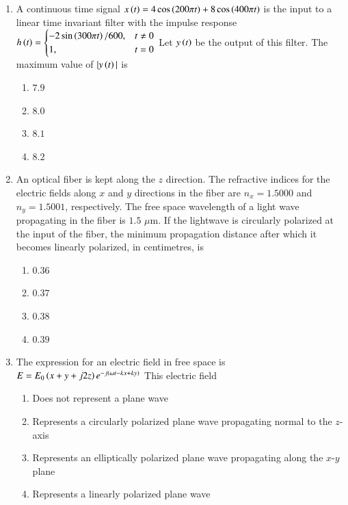 \documentclass[journal,12pt,onecolumn]{IEEEtran}
\theoremstyle{remark}
\begin{document}
\begin{enumerate}
\item A continuous time signal $x\left(t\right) = 4 \cos\left(200\pi t\right) + 8 \cos\left(400\pi t\right)$ is the input to a linear time invariant  filter with the impulse response  
$h\left(t\right) = \begin{cases}
-2 \sin\left(300\pi t\right)/600, & t \neq 0 \\
1, & t = 0
\end{cases}$  
Let $y\left(t\right)$ be the output of this filter. The maximum value of $|y\left(t\right)|$ is
\begin{multicols}{4}
\begin{enumerate}
\item $7.9$
\item $8.0$
\item $8.1$
\item $8.2$
\end{enumerate}
\end{multicols}
\hfill {}

\item An optical fiber is kept along the $z$ direction. The refractive indices for the electric fields along $x$ and $y$ directions in the fiber are $n_x = 1.5000$ and $n_y = 1.5001$, respectively. The free space wavelength of a light wave propagating in the fiber is $1.5$ $\mu$m. If the lightwave is circularly polarized at the input of the fiber, the minimum propagation distance after which it becomes linearly polarized, in centimetres, is
\begin{multicols}{4}
\begin{enumerate}
\item $0.36$
\item $0.37$
\item $0.38$
\item $0.39$
\end{enumerate}
\end{multicols}
\hfill {}

\item The expression for an electric field in free space is  
$E = E_0 \left(x + y + j2z\right) e^{-j\left(\omega t - kx + ky\right)}$  
This electric field
\begin{enumerate}
\item Does not represent a plane wave
\item Represents a circularly polarized plane wave propagating normal to the $z$-axis
\item Represents an elliptically polarized plane wave propagating along the $x$-$y$ plane
\item Represents a linearly polarized plane wave
\end{enumerate}
\hfill {}


\end{enumerate}
\end{document}
